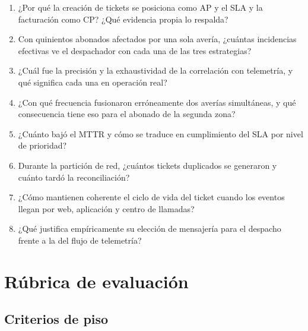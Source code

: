 \documentclass[11pt,a4paper]{article}
\begin{document}
\begin{enumerate}[leftmargin=*,itemsep=4pt]
	\item ¿Por qué la creación de tickets se posiciona como AP y el SLA y la facturación como CP? ¿Qué evidencia propia lo respalda?
	\item Con quinientos abonados afectados por una sola avería, ¿cuántas incidencias efectivas ve el despachador con cada una de las tres estrategias?
	\item ¿Cuál fue la precisión y la exhaustividad de la correlación con telemetría, y qué significa cada una en operación real?
	\item ¿Con qué frecuencia fusionaron erróneamente dos averías simultáneas, y qué consecuencia tiene eso para el abonado de la segunda zona?
	\item ¿Cuánto bajó el MTTR y cómo se traduce en cumplimiento del SLA por nivel de prioridad?
	\item Durante la partición de red, ¿cuántos tickets duplicados se generaron y cuánto tardó la reconciliación?
	\item ¿Cómo mantienen coherente el ciclo de vida del ticket cuando los eventos llegan por web, aplicación y centro de llamadas?
	\item ¿Qué justifica empíricamente su elección de mensajería para el despacho frente a la del flujo de telemetría?
\end{enumerate}

\section{Rúbrica de evaluación}

\subsection{Criterios de piso}
\end{document}
